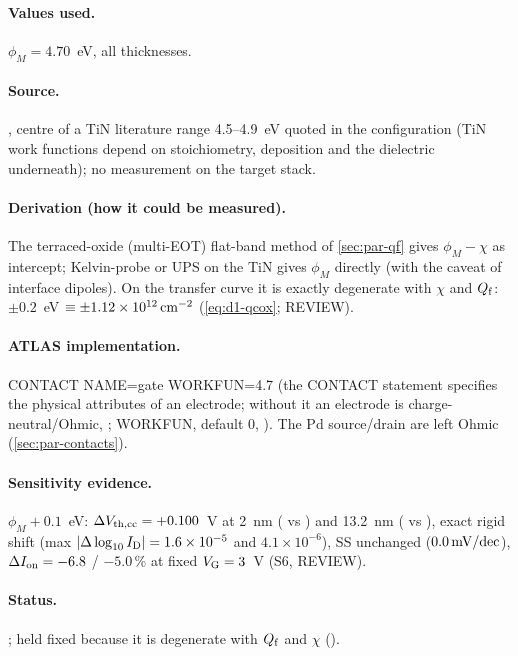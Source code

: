 \paragraph{Values used.}
$\phi_M = 4.70$~eV, all thicknesses.

\paragraph{Source.}
, centre of a TiN literature range 4.5--4.9~eV quoted in the configuration (TiN work functions depend on
stoichiometry, deposition and the dielectric underneath); no measurement on the target stack.

\paragraph{Derivation (how it could be measured).}
The terraced-oxide (multi-EOT) flat-band method of \cref{sec:par-qf} gives $\phi_M-\chi$ as intercept; Kelvin-probe or
UPS on the TiN gives $\phi_M$ directly (with the caveat of interface dipoles). On the transfer curve it is exactly
degenerate with $\chi$ and $Q_{\mathrm{f}}$: $\pm0.2$~eV $\equiv \pm1.12\times10^{12}\,\mathrm{cm}^{-2}$ (\cref{eq:d1-qcox}; REVIEW).

\paragraph{ATLAS implementation.}
CONTACT NAME=gate WORKFUN=4.7 (the CONTACT statement specifies the physical attributes of an electrode; without it an
electrode is charge-neutral/Ohmic, \citealp[p.~1145]{AtlasManual}; WORKFUN, default 0,
\citealp[p.~1148]{AtlasManual}). The Pd source/drain are left Ohmic (\cref{sec:par-contacts}).

\paragraph{Sensitivity evidence.}
$\phi_M + 0.1$~eV: $\Delta V_{\mathrm{th,cc}} = +0.100$~V at 2~nm ( vs ) and 13.2~nm ( vs ),
exact rigid shift (max $|\Delta\log_{10}I_{\mathrm{D}}| = 1.6\times10^{-5}$ and $4.1\times10^{-6}$), SS unchanged ($0.0\,\mathrm{mV/dec}$),
$\Delta I_{\mathrm{on}} = -6.8$ / $-5.0$\,\% at fixed $V_{\mathrm{G}} = 3$~V (S6, REVIEW).

\paragraph{Status.}
; held fixed because it is degenerate with $Q_{\mathrm{f}}$ and $\chi$ (\evNUM).

